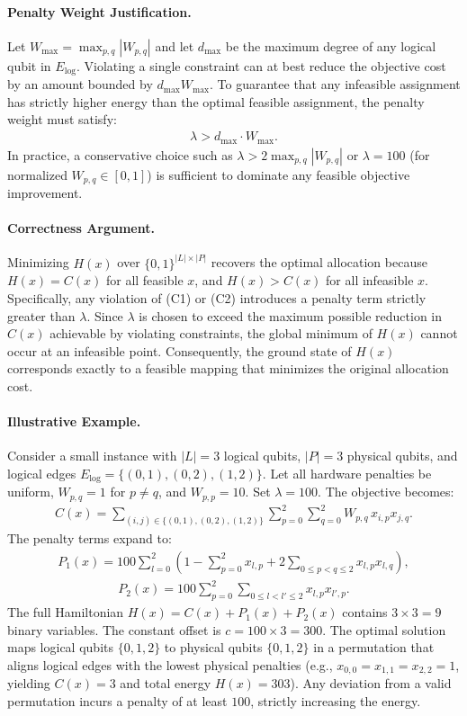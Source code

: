 \documentclass[12pt]{article}
\begin{document}
\paragraph{Penalty Weight Justification.}
Let $W_{\max} = \max_{p,q} |W_{p,q}|$ and let $d_{\max}$ be the maximum degree of any logical qubit in $E_{\text{log}}$. Violating a single constraint can at best reduce the objective cost by an amount bounded by $d_{\max} W_{\max}$. To guarantee that any infeasible assignment has strictly higher energy than the optimal feasible assignment, the penalty weight must satisfy:
\begin{align}
\lambda > d_{\max} \cdot W_{\max}.
\end{align}
In practice, a conservative choice such as $\lambda > 2 \max_{p,q} |W_{p,q}|$ or $\lambda = 100$ (for normalized $W_{p,q} \in [0,1]$) is sufficient to dominate any feasible objective improvement.

\paragraph{Correctness Argument.}
Minimizing $H(x)$ over $\{0,1\}^{|L| \times |P|}$ recovers the optimal allocation because $H(x) = C(x)$ for all feasible $x$, and $H(x) > C(x)$ for all infeasible $x$. Specifically, any violation of (C1) or (C2) introduces a penalty term strictly greater than $\lambda$. Since $\lambda$ is chosen to exceed the maximum possible reduction in $C(x)$ achievable by violating constraints, the global minimum of $H(x)$ cannot occur at an infeasible point. Consequently, the ground state of $H(x)$ corresponds exactly to a feasible mapping that minimizes the original allocation cost.

\paragraph{Illustrative Example.}
Consider a small instance with $|L| = 3$ logical qubits, $|P| = 3$ physical qubits, and logical edges $E_{\text{log}} = \{(0,1), (0,2), (1,2)\}$. Let all hardware penalties be uniform, $W_{p,q} = 1$ for $p \neq q$, and $W_{p,p} = 10$. Set $\lambda = 100$. The objective becomes:
\begin{align}
C(x) = \sum_{(i,j) \in \{(0,1),(0,2),(1,2)\}} \sum_{p=0}^{2} \sum_{q=0}^{2} W_{p,q} \, x_{i,p} x_{j,q}.
\end{align}
The penalty terms expand to:
\begin{align}
P_1(x) = 100 \sum_{l=0}^{2} \left( 1 - \sum_{p=0}^{2} x_{l,p} + 2 \sum_{0 \le p < q \le 2} x_{l,p} x_{l,q} \right),
\end{align}
\begin{align}
P_2(x) = 100 \sum_{p=0}^{2} \sum_{0 \le l < l' \le 2} x_{l,p} x_{l',p}.
\end{align}
The full Hamiltonian $H(x) = C(x) + P_1(x) + P_2(x)$ contains $3 \times 3 = 9$ binary variables. The constant offset is $c = 100 \times 3 = 300$. The optimal solution maps logical qubits $\{0,1,2\}$ to physical qubits $\{0,1,2\}$ in a permutation that aligns logical edges with the lowest physical penalties (e.g., $x_{0,0}=x_{1,1}=x_{2,2}=1$, yielding $C(x)=3$ and total energy $H(x)=303$). Any deviation from a valid permutation incurs a penalty of at least $100$, strictly increasing the energy.
\end{document}
